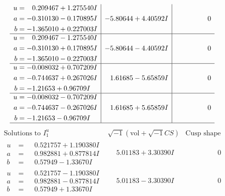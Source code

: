 \documentclass[1p]{elsarticle_modified}
\theoremstyle{definition}
\newcommand{\I}{\sqrt{-1}}
\begin{document}
$$\begin{array}{c|c|c}
\begin{aligned}
u &= \phantom{-}0.209467 + 1.275540 I \\
a &= -0.310130 - 0.170895 I \\
b &= -1.365010 + 0.227003 I\end{aligned}
 & -5.80644 + 4.40592 I & \phantom{-0.000000 } 0 \\ \hline\begin{aligned}
u &= \phantom{-}0.209467 - 1.275540 I \\
a &= -0.310130 + 0.170895 I \\
b &= -1.365010 - 0.227003 I\end{aligned}
 & -5.80644 - 4.40592 I & \phantom{-0.000000 } 0 \\ \hline\begin{aligned}
u &= -0.008032 + 0.707209 I \\
a &= -0.744637 + 0.267026 I \\
b &= -1.21653 + 0.96709 I\end{aligned}
 & \phantom{-}1.61685 - 5.65859 I & \phantom{-0.000000 } 0 \\ \hline\begin{aligned}
u &= -0.008032 - 0.707209 I \\
a &= -0.744637 - 0.267026 I \\
b &= -1.21653 - 0.96709 I\end{aligned}
 & \phantom{-}1.61685 + 5.65859 I & \phantom{-0.000000 } 0\\
 \hline 
 \end{array}$$\newpage$$\begin{array}{c|c|c}  
\text{Solutions to }I^u_{1}& \I (\text{vol} + \sqrt{-1}CS) & \text{Cusp shape}\\
 \hline 
\begin{aligned}
u &= \phantom{-}0.521757 + 1.190380 I \\
a &= \phantom{-}0.982881 + 0.877814 I \\
b &= \phantom{-}0.57949 - 1.33670 I\end{aligned}
 & \phantom{-}5.01183 + 3.30390 I & \phantom{-0.000000 } 0 \\ \hline\begin{aligned}
u &= \phantom{-}0.521757 - 1.190380 I \\
a &= \phantom{-}0.982881 - 0.877814 I \\
b &= \phantom{-}0.57949 + 1.33670 I\end{aligned}
 & \phantom{-}5.01183 - 3.30390 I & \phantom{-0.000000 } 0 \\ \hline\begin{aligned}

\end{aligned}
\end{array}$$
\end{document}
